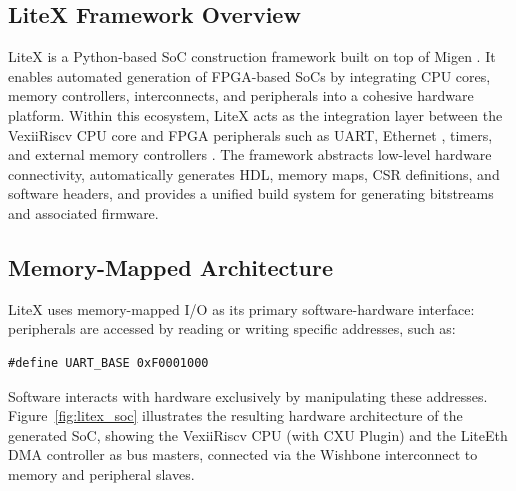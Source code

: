 \subsection{LiteX Framework Overview}
\label{subsec:litex_overview}

LiteX \cite{LiteXGitHub} is a Python-based SoC construction framework built on top of
Migen \cite{MiSoC2014}.
It enables automated generation of FPGA-based SoCs by integrating CPU cores,
memory controllers, interconnects, and peripherals into a cohesive hardware platform.
Within this ecosystem, LiteX acts as the integration layer between the VexiiRiscv CPU
core and FPGA peripherals such as UART, Ethernet \cite{LiteEthGithub}, timers, and
external memory controllers \cite{LiteDramGithub, LitePcieGithub}.
The framework abstracts low-level hardware connectivity, automatically generates HDL,
memory maps, CSR definitions, and software headers, and provides a unified build system
for generating bitstreams and associated firmware.

\subsection{Memory-Mapped Architecture}
\label{subsec:memory_mapped}

LiteX uses memory-mapped I/O as its primary software-hardware interface: peripherals
are accessed by reading or writing specific addresses, such as:

\begin{verbatim}
#define UART_BASE 0xF0001000
\end{verbatim}

Software interacts with hardware exclusively by manipulating these addresses.
Figure~\ref{fig:litex_soc} illustrates the resulting hardware architecture of the
generated SoC, showing the VexiiRiscv CPU (with CXU Plugin) and the LiteEth DMA
controller as bus masters, connected via the Wishbone interconnect to memory and
peripheral slaves.

